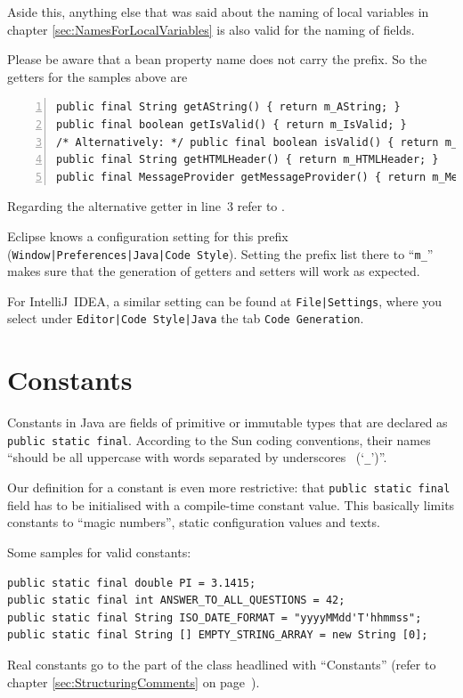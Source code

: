 \documentclass[11pt,a4paper, titlepage, parskip=half, headsepline, footsepline, cleardoublepage=current, headheight=1cm]{scrbook}
\newcommand*{\tqref}[1]{\hyperref[{#1}]{\ref*{#1}}}
\newcommand*{\tqvref}[1]{\hyperref[{#1}]{\ref*{#1}} on page~\pageref{#1}}
\begin{document}
Aside this, anything else that was said about the naming of local variables in chapter \tqref{sec:NamesForLocalVariables} is also valid for the naming of fields.

Please be aware that a bean property name does not carry the prefix. So the getters for the samples above are
\begin{lstlisting}[numbers=left]
public final String getAString() { return m_AString; }
public final boolean getIsValid() { return m_IsValid; }
/* Alternatively: */ public final boolean isValid() { return m_IsValid; }
public final String getHTMLHeader() { return m_HTMLHeader; }
public final MessageProvider getMessageProvider() { return m_MessageProvider; }
\end{lstlisting}

Regarding the alternative getter in line~3 refer to \autocite{ORACLE_DOC_JAVABEANS:Chapter8_3_2}.

Eclipse knows a configuration setting for this prefix (\verb#Window|Preferences|Java|Code Style#). Setting the prefix list there to “\verb#m_#” makes sure that the generation of getters and setters will work as expected.

For IntelliJ~IDEA, a similar setting can be found at \verb#File|Settings#, where you select under \verb#Editor|Code Style|Java# the tab \verb#Code Generation#.


\section{Constants}\label{sec:Constants}
Constants in Java are fields of primitive or immutable types that are declared as \lstinline|public static final|. According to the Sun coding conventions, their names “should be all uppercase with words separated by underscores~ (‘\verb#_#’)”\autocite{SUN_CODE_CONVENTIONS:NamingConventions}.

Our definition for a constant is even more restrictive: that \lstinline|public static final| field has to be initialised with a compile-time constant value. This basically limits constants to “magic numbers”, static configuration values and texts.

Some samples for valid constants:
\begin{lstlisting}
public static final double PI = 3.1415;
public static final int ANSWER_TO_ALL_QUESTIONS = 42;
public static final String ISO_DATE_FORMAT = "yyyyMMdd'T'hhmmss";
public static final String [] EMPTY_STRING_ARRAY = new String [0];
\end{lstlisting}
Real constants go to the part of the class headlined with “Constants” (refer to chapter \tqvref{sec:StructuringComments}).
\end{document}
